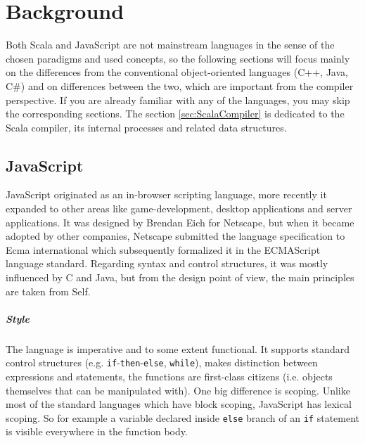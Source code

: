 \documentclass[12pt,a4paper]{report}
\begin{document}
\chapter{Background}

Both Scala and JavaScript are not mainstream languages in the sense of the chosen paradigms and used concepts, so the following sections will focus mainly on the differences from the conventional object-oriented languages (C++, Java, C\#) and on differences between the two, which are important from the compiler perspective. If you are already familiar with any of the languages, you may skip the corresponding sections. The section \ref{sec:ScalaCompiler} is dedicated to the Scala compiler, its internal processes and related data structures.

\section{JavaScript}

JavaScript\cite{JavaScript} originated as an in-browser scripting language, more recently it expanded to other areas like game-development, desktop applications and server applications. It was designed by Brendan Eich for Netscape, but when it became adopted by other companies, Netscape submitted the language specification to Ecma international which subsequently formalized it in the ECMAScript language standard\cite{EcmaScript}. Regarding syntax and control structures, it was mostly influenced by C and Java, but from the design point of view, the main principles are taken from Self\cite{Self}.

\paragraph{Style} The language is imperative and to some extent functional. It supports standard control structures (e.g. \texttt{if}-\texttt{then}-\texttt{else}, \texttt{while}), makes distinction between expressions and statements, the functions are first-class citizens (i.e. objects themselves that can be manipulated with). One big difference is scoping. Unlike most of the standard languages which have block scoping, JavaScript has lexical scoping. So for example a variable declared inside \texttt{else} branch of an \texttt{if} statement is visible everywhere in the function body.
\end{document}

